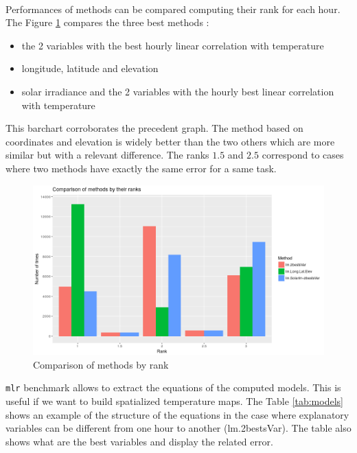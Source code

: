 \documentclass[12pt,twoside]{reedthesis}
\providecommand{\tightlist}{%
  \setlength{\itemsep}{0pt}\setlength{\parskip}{0pt}}
\theoremstyle{definition}
\theoremstyle{definition}
\theoremstyle{definition}
\theoremstyle{remark}
\begin{document}
~

Performances of methods can be compared computing their rank for each
hour. The Figure \ref{fig:barchart} compares the three best methods :
\begin{itemize}
\tightlist
\item
  the 2 variables with the best hourly linear correlation with
  temperature
\item
  longitude, latitude and elevation
\item
  solar irradiance and the 2 variables with the hourly best linear
  correlation with temperature
\end{itemize}
This barchart corroborates the precedent graph. The method based on
coordinates and elevation is widely better than the two others which are
more similar but with a relevant difference. The ranks \(1.5\) and
\(2.5\) correspond to cases where two methods have exactly the same
error for a same task.
\begin{figure}

{\centering \includegraphics[width=1\linewidth]{figure/barchart} 

}

\caption{Comparison of methods by rank}\label{fig:barchart}
\end{figure}
\texttt{mlr} benchmark allows to extract the equations of the computed
models. This is useful if we want to build spatialized temperature maps.
The Table \ref{tab:models} shows an example of the structure of the
equations in the case where explanatory variables can be different from
one hour to another (lm.2bestsVar). The table also shows what are the
best variables and display the related error.
\end{document}
